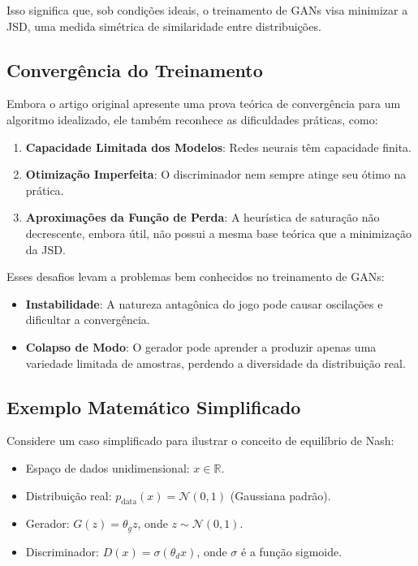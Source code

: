 \documentclass{article}
\begin{document}
Isso significa que, sob condições ideais, o treinamento de GANs visa minimizar a JSD, uma medida simétrica de similaridade entre distribuições.
\subsection{Convergência do Treinamento}

Embora o artigo original apresente uma prova teórica de convergência para um algoritmo idealizado, ele também reconhece as dificuldades práticas, como:

\begin{enumerate}
    \item \textbf{Capacidade Limitada dos Modelos}: Redes neurais têm capacidade finita.
    \item \textbf{Otimização Imperfeita}: O discriminador nem sempre atinge seu ótimo na prática.
    \item \textbf{Aproximações da Função de Perda}: A heurística de saturação não decrescente, embora útil, não possui a mesma base teórica que a minimização da JSD.
\end{enumerate}

Esses desafios levam a problemas bem conhecidos no treinamento de GANs:

\begin{itemize}
    \item \textbf{Instabilidade}: A natureza antagônica do jogo pode causar oscilações e dificultar a convergência.
    \item \textbf{Colapso de Modo}: O gerador pode aprender a produzir apenas uma variedade limitada de amostras, perdendo a diversidade da distribuição real.
\end{itemize}

\subsection{Exemplo Matemático Simplificado}

Considere um caso simplificado para ilustrar o conceito de equilíbrio de Nash:

\begin{itemize}
    \item Espaço de dados unidimensional: $x \in \mathbb{R}$.
    \item Distribuição real: $p_{\text{data}}(x) = \mathcal{N}(0, 1)$ (Gaussiana padrão).
    \item Gerador: $G(z) = \theta_g z$, onde $z \sim \mathcal{N}(0, 1)$.
    \item Discriminador: $D(x) = \sigma(\theta_d x)$, onde $\sigma$ é a função sigmoide.
\end{itemize}
\end{document}
